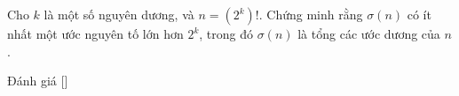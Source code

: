 \ifshowproblem
\begin{problem}\label{problem:CHN-2015-WMO-P8}
    Cho $k$ là một số nguyên dương, và $n = \left(2^k\right)!$. Chứng minh rằng $\sigma(n)$ có ít nhất một ước nguyên tố lớn hơn $2^k$,
    trong đó $\sigma(n)$ là tổng các ước dương của $n$.
\end{problem}
\fi

\ifshowinfo
Đánh giá [\textbf{}]\footnotemark
{}
\fi